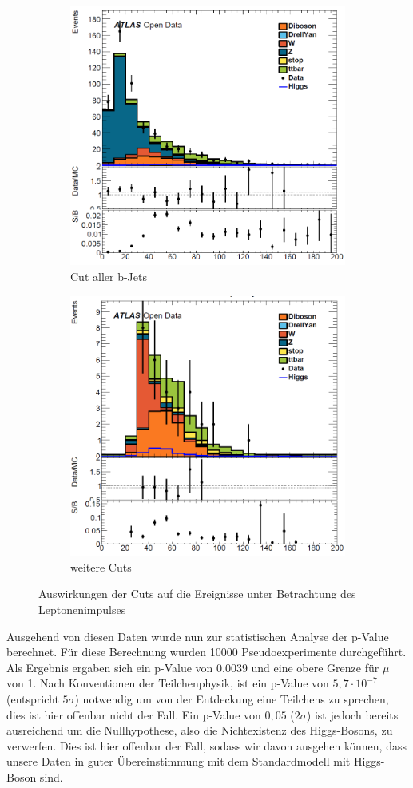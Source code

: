 \begin{figure}[h]
\begin{subfigure}{.5\textwidth}
\centering
\includegraphics[width=.8\linewidth]{../Pictures/Auswertung/2cut_momentum.png}
\caption{Cut aller b-Jets}
\end{subfigure}%
\begin{subfigure}{.5\textwidth}
\centering
\includegraphics[width=.8\linewidth]{../Pictures/Auswertung/3cut_momentum.png}
\caption{weitere Cuts}
\end{subfigure}%
\caption{Auswirkungen der Cuts auf die Ereignisse unter Betrachtung des Leptonenimpulses}
\label{Cuts_momentum}
\end{figure}

Ausgehend von diesen Daten wurde nun zur statistischen Analyse der p-Value berechnet.
Für diese Berechnung wurden 10000 Pseudoexperimente durchgeführt.
Als Ergebnis ergaben sich ein p-Value von 0.0039 und eine obere Grenze für $\mu$ von 1.
Nach Konventionen der Teilchenphysik, ist ein p-Value von $5,7 \cdot 10^{-7}$ (entspricht $5 \sigma$) notwendig um von der Entdeckung eine Teilchens zu sprechen, dies ist hier offenbar nicht der Fall.
Ein p-Value von $0,05$ ($2 \sigma$) ist jedoch bereits ausreichend um die Nullhypothese, also die Nichtexistenz des Higgs-Bosons, zu verwerfen.
Dies ist hier offenbar der Fall, sodass wir davon ausgehen können, dass unsere Daten in guter Übereinstimmung mit dem Standardmodell mit Higgs-Boson sind.
